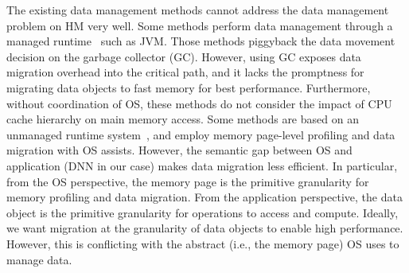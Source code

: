 \textcolor{check}{The existing data management methods cannot address the data management problem on HM very well. Some methods perform data management through a managed runtime~\cite{pldi19:panthera, pldi18:KG,ASPLOS18:Espresso,sigmetrics19:crystalgazer} such as JVM. Those methods piggyback the data movement decision on the garbage collector (GC). However, using GC exposes data migration overhead into the critical path, and it lacks the promptness for migrating data objects to fast memory for best performance. Furthermore, without coordination of OS, these methods do not consider the impact of CPU cache hierarchy on main memory access. 
Some methods are based on an unmanaged runtime system~\cite{Thermostat:asplos17,RAMinate:socc16,heteros:isca17,unimem:sc17,sc18:wu,Yan:ASPLOS19}, and employ memory page-level profiling and data migration with OS assists. However, the semantic gap between OS and application (DNN in our case) makes data migration less efficient. In particular, from the OS perspective, the memory page is the primitive granularity for memory profiling and data migration. From the application perspective, the data object is the primitive granularity for operations to access and compute. Ideally, we want migration at the granularity of data objects to enable high performance. However, this is conflicting with the abstract (i.e., the memory page) OS uses to manage data. %
}


